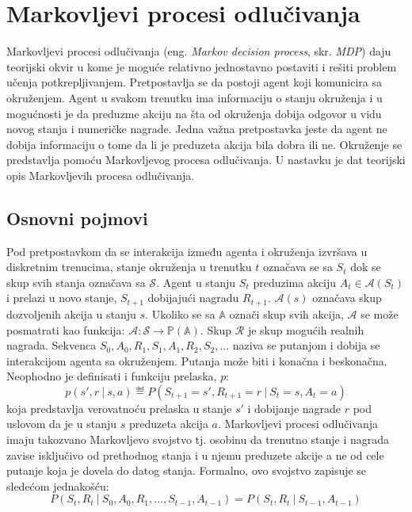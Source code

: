 \chapter{Markovljevi procesi odlučivanja}
\label{ch:mdp}

Markovljevi procesi odlučivanja (eng. {\em Markov decision process}, skr. {\em MDP}) daju teorijski okvir u kome je moguće relativno jednostavno postaviti i rešiti problem učenja potkrepljivanjem. Pretpostavlja se da postoji agent koji komunicira sa okruženjem. Agent u svakom trenutku ima informaciju o stanju okruženja i u mogućnosti je da preduzme akciju na šta od okruženja dobija odgovor u vidu novog stanja i numeričke nagrade. Jedna važna pretpostavka jeste da agent ne dobija informaciju o tome da li je preduzeta akcija bila dobra ili ne. Okruženje se predstavlja pomoću Markovljevog procesa odlučivanja. U nastavku je dat teorijski opis Markovljevih procesa odlučivanja.

\section{Osnovni pojmovi}
Pod pretpostavkom da se interakcija između agenta i okruženja izvršava u diskretnim trenucima, stanje okruženja u trenutku $t$ označava se sa $S_t$ dok se skup svih stanja označava sa $\mathcal{S}$.  Agent u stanju $S_t$ preduzima akciju $A_t \in \mathcal{A}(S_t)$ i prelazi u novo stanje, $S_{t+1}$ dobijajući nagradu $R_{t+1}$. $\mathcal{A}(s)$ označava skup dozvoljenih akcija u stanju $s$. Ukoliko se sa $\mathbb{A}$ označi skup svih akcija, $\mathcal{A}$ se može posmatrati kao funkcija:  $\mathcal{A}: \mathcal{S} \rightarrow  \mathbb{P}(\mathbb{A})$. Skup $\mathcal{R}$ je skup mogućih realnih nagrada. Sekvenca $S_0, A_0, R_1, S_1, A_1, R_2, S_2, ...$ naziva se putanjom i dobija se interakcijom agenta sa okruženjem. Putanja može biti i konačna i beskonačna.
Neophodno je definisati i funkciju prelaska, $p$:
\begin{equation}
	p(s', r ~|~ s, a) \eqdef P(S_{t+1} = s', R_{t+1} = r ~|~ S_t = s, A_t = a)
\end{equation}
koja predstavlja verovatnoću prelaska u stanje $s'$ i dobijanje nagrade $r$ pod uslovom da je u stanju $s$ preduzeta akcija $a$. Markovljevi procesi odlučivanja imaju takozvano Markovljevo svojstvo tj. osobinu da trenutno stanje i nagrada zavise isključivo od prethodnog stanja i u njemu preduzete akcije a ne od cele putanje koja je dovela do datog stanja. Formalno, ovo svojstvo zapisuje se sledećom jednakošću:
\begin{equation}
	P(S_t, R_t ~|~ S_0, A_0, R_1, ..., S_{t-1}, A_{t-1}) = P(S_t, R_t ~|~ S_{t-1}, A_{t-1})
\end{equation}

